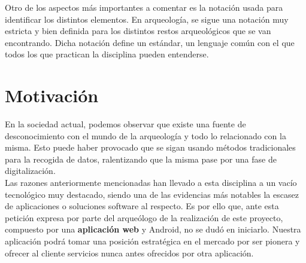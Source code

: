 Otro de los aspectos más importantes a comentar es la notación usada para identificar los
distintos elementos. En arqueología, se sigue una notación muy estricta y bien definida para
los distintos restos arqueológicos que se van encontrando. Dicha notación define un estándar,
un lenguaje común con el que todos los que practican la disciplina pueden entenderse.

\section{Motivación}
En la sociedad actual, podemos observar que existe una fuente de desconocimiento con el mundo
de la arqueología y todo lo relacionado con la misma. Esto puede haber provocado que se sigan
usando métodos tradicionales para la recogida de datos, ralentizando que la misma pase por una
fase de digitalización. \\

Las razones anteriormente mencionadas han llevado a esta disciplina a un vacío tecnológico muy
destacado, siendo una de las evidencias más notables la escasez de aplicaciones o soluciones
software al respecto. Es por ello que, ante esta petición expresa por parte del arqueólogo
de la realización de este proyecto, compuesto por una \textbf{aplicación web} y Android, no se
dudó en iniciarlo. Nuestra aplicación podrá tomar una posición estratégica en el mercado por
ser pionera y ofrecer al cliente servicios nunca antes ofrecidos por otra aplicación.
